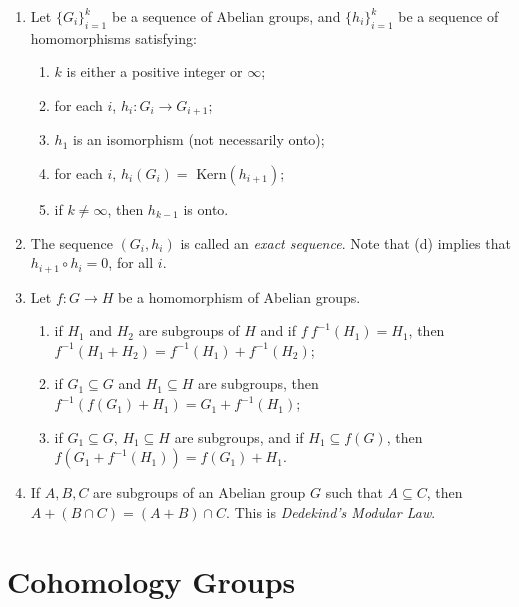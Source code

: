 \documentclass{article}
\begin{document}
\begin{enumerate}[\hspace{1cm}(1)]
    The following diagram represents the situation:
    \begin{gather*}
    G_1 \xrightarrow{f^*} H_1 \\
    \alpha\uparrow \quad\quad\quad \uparrow\beta \\
    G_2 \xrightarrow{\ f \ } H_2
    \end{gather*}

  \item Let $\{ G_i \}_{i=1}^k$ be a sequence of Abelian groups, and $\{ h_i \} _{i=1}^k$ be a sequence of homomorphisms satisfying:
    \begin{enumerate}[\hspace{1cm}(a)]
      \item $k$ is either a positive integer or $\infty$;
      \item for each $i$, $h_i: G_i \longrightarrow G_{i+1}$;
      \item $h_1$ is an isomorphism (not necessarily onto);
      \item for each $i$, $h_i(G_i)= \text{ Kern}(h_{i+1})$;
      \item if $k \neq \infty$, then $h_{k-1}$ is onto.
    \end{enumerate}
  \item The sequence $(G_i,h_i)$ is called an \emph{exact sequence}. Note that (d) implies that $h_{i+1} \circ h_i=0$, for all $i$.
  \item Let $f: G \longrightarrow H$ be a homomorphism of Abelian groups.
    \begin{enumerate}[\hspace{1cm}(a)]
      \item if $H_1$ and $H_2$ are subgroups of $H$ and if $f \ f^{-1}(H_1)=H_1$, then $f^{-1}(H_1+H_2)= f^{-1}(H_1)+f^{-1}(H_2)$;
      \item if $G_1 \subseteq G$ and $H_1 \subseteq H$ are subgroups, then $f^{-1}(f(G_1)+H_1)=G_1+f^{-1}(H_1)$;
      \item if $G_1 \subseteq G$, $H_1 \subseteq H$ are subgroups, and if $H_1 \subseteq f(G)$, then $f(G_1+f^{-1}(H_1))=f(G_1)+H_1$.
    \end{enumerate}
  \item If $A,B,C$ are subgroups of an Abelian group $G$ such that $A \subseteq C$, then $A+(B \cap C)=(A+B) \cap C$. This is \emph{Dedekind's Modular Law}.
\end{enumerate}



\section{Cohomology Groups}
\end{document}
